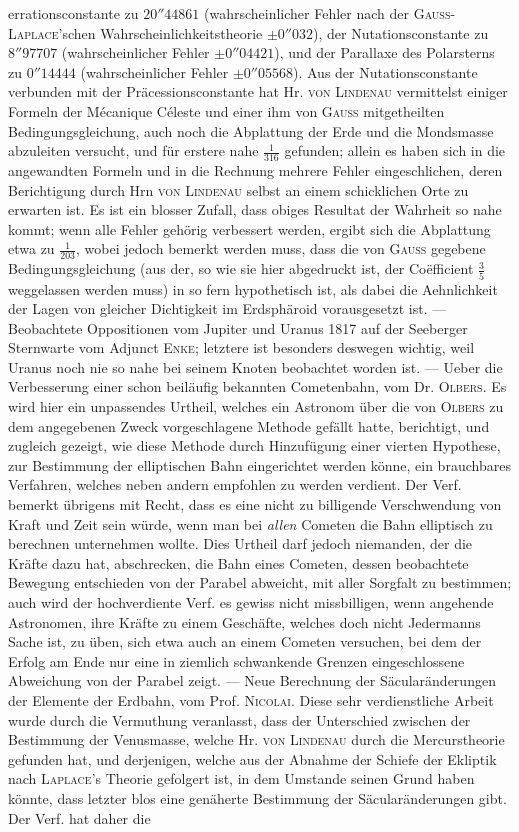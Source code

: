 \noindent errationsconstante zu $20''44861$ (wahrscheinlicher Fehler nach der \textsc{Gauss-Laplace}'schen Wahrscheinlichkeitstheorie $\pm0''032$), der Nutationsconstante zu $8''97707$ (wahrscheinlicher Fehler $\pm0''04421$), und der Parallaxe des Polarsterns zu $0''14444$ (wahrscheinlicher Fehler $\pm0''05568$). Aus der Nutationsconstante verbunden mit der Präcessionsconstante hat Hr. \textsc{von Lindenau} vermittelst einiger Formeln der Mécanique Céleste und einer ihm von \textsc{Gauss} mitgetheilten Bedingungsgleichung, auch noch die Abplattung der Erde und die Mondsmasse abzuleiten versucht, und für erstere nahe $\tfrac{1}{316}$ gefunden; allein es haben sich in die angewandten Formeln und in die Rechnung mehrere Fehler eingeschlichen, deren Berichtigung durch Hrn \textsc{von Lindenau} selbst an einem schicklichen Orte zu erwarten ist. Es ist ein blosser Zufall, dass obiges Resultat der Wahrheit so nahe kommt; wenn alle Fehler gehörig verbessert werden, ergibt sich die Abplattung etwa zu $\tfrac{1}{203}$, wobei jedoch bemerkt werden muss, dass die von \textsc{Gauss} gegebene Bedingungsgleichung (aus der, so wie sie hier abgedruckt ist, der Coëfficient $\tfrac{3}{5}$ weggelassen werden muss) in so fern hypothetisch ist, als dabei die Aehnlichkeit der Lagen von gleicher Dichtigkeit im Erdsphäroid vorausgesetzt ist. --- Beobachtete Oppositionen vom Jupiter und Uranus 1817 auf der Seeberger Sternwarte vom Adjunct \textsc{Enke}; letztere ist besonders deswegen wichtig, weil Uranus noch nie so nahe bei seinem Knoten beobachtet worden ist. --- Ueber die Verbesserung einer schon beiläufig bekannten Cometenbahn, vom Dr. \textsc{Olbers}. Es wird hier ein unpassendes Urtheil, welches ein Astronom über die von \textsc{Olbers} zu dem angegebenen Zweck vorgeschlagene Methode gefällt hatte, berichtigt, und zugleich gezeigt, wie diese Methode durch Hinzufügung einer vierten Hypothese, zur Bestimmung der elliptischen Bahn eingerichtet werden könne, ein brauchbares Verfahren, welches neben andern empfohlen zu werden verdient. Der Verf. bemerkt übrigens mit Recht, dass es eine nicht zu billigende Verschwendung von Kraft und Zeit sein würde, wenn man bei \emph{allen} Cometen die Bahn elliptisch zu berechnen unternehmen wollte. Dies Urtheil darf jedoch niemanden, der die Kräfte dazu hat, abschrecken, die Bahn eines Cometen, dessen beobachtete Bewegung entschieden von der Parabel abweicht, mit aller Sorgfalt zu bestimmen; auch wird der hochverdiente Verf. es gewiss nicht missbilligen, wenn angehende Astronomen, ihre Kräfte zu einem Geschäfte, welches doch nicht Jedermanns Sache ist, zu üben, sich etwa auch an einem Cometen versuchen, bei dem der Erfolg am Ende nur eine in ziemlich schwankende Grenzen eingeschlossene Abweichung von der Parabel zeigt. --- Neue Berechnung der Säcularänderungen der Elemente der Erdbahn, vom Prof. \textsc{Nicolai}. Diese sehr verdienstliche Arbeit wurde durch die Vermuthung veranlasst, dass der Unterschied zwischen der Bestimmung der Venusmasse, welche Hr. \textsc{von Lindenau} durch die Mercurstheorie gefunden hat, und derjenigen, welche aus der Abnahme der Schiefe der Ekliptik nach \textsc{Laplace}'s Theorie gefolgert ist, in dem Umstande seinen Grund haben könnte, dass letzter blos eine genäherte Bestimmung der Säcularänderungen gibt. Der Verf. hat daher die 